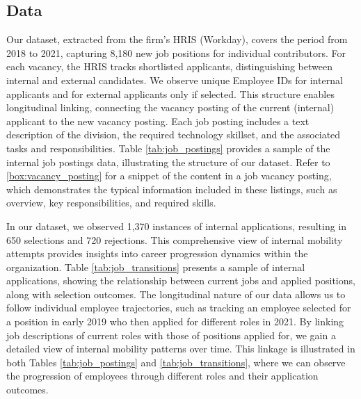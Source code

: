 \documentclass[12pt]{article}
\begin{document}
\subsection{Data}

Our dataset, extracted from the firm's HRIS (Workday), covers the period from 2018 to 2021, capturing 8,180 new job positions for individual contributors. For each vacancy, the HRIS tracks shortlisted applicants, distinguishing between internal and external candidates. We observe unique Employee IDs for internal applicants and for external applicants only if selected. This structure enables longitudinal linking, connecting the vacancy posting of the current (internal) applicant to the new vacancy posting. Each job posting includes a text description of the division, the required technology skillset, and the associated tasks and responsibilities. Table \ref{tab:job_postings} provides a sample of the internal job postings data, illustrating the structure of our dataset. Refer to \ref{box:vacancy_posting} for a snippet of the content in a job vacancy posting, which demonstrates the typical information included in these listings, such as overview, key responsibilities, and required skills.

In our dataset, we observed 1,370 instances of internal applications, resulting in 650 selections and 720 rejections. This comprehensive view of internal mobility attempts provides insights into career progression dynamics within the organization. Table \ref{tab:job_transitions} presents a sample of internal applications, showing the relationship between current jobs and applied positions, along with selection outcomes. The longitudinal nature of our data allows us to follow individual employee trajectories, such as tracking an employee selected for a position in early 2019 who then applied for different roles in 2021. By linking job descriptions of current roles with those of positions applied for, we gain a detailed view of internal mobility patterns over time. This linkage is illustrated in both Tables \ref{tab:job_postings} and \ref{tab:job_transitions}, where we can observe the progression of employees through different roles and their application outcomes.
\end{document}
